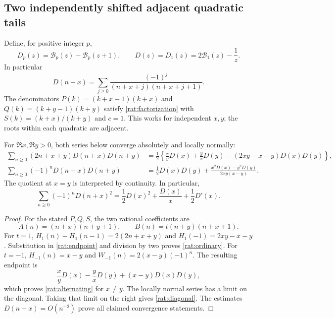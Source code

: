 \subsection{Two independently shifted adjacent quadratic tails}

Define, for positive integer $p$,
\begin{equation}\label{rat:D-definition}
 D_p(z)=\mathcal B_p(z)-\mathcal B_p(z+1),\qquad
 D(z)=D_1(z)=2\mathcal B_1(z)-\frac1z.
\end{equation}
In particular
\[
 D(n+x)=\sum_{j\ge0}\frac{(-1)^j}
                          {(n+x+j)(n+x+j+1)}.
\]
The denominators $P(k)=(k+x-1)(k+x)$ and
$Q(k)=(k+y-1)(k+y)$ satisfy \eqref{rat:factorization} with
$S(k)=(k+x)/(k+y)$ and $c=1$. This works for independent $x,y$;
the roots within each quadratic are adjacent.

\begin{theorem}\label{rat:kernels}
For $\Re x,\Re y>0$, both series below converge absolutely and
locally normally:
\begin{align}
 \sum_{n\ge0}(2n+x+y)D(n+x)D(n+y)
 &=\frac12\left\{\frac{x}{y}D(x)+\frac{y}{x}D(y)
                -(2xy-x-y)D(x)D(y)\right\},\label{rat:ordinary}\\
 \sum_{n\ge0}(-1)^nD(n+x)D(n+y)
 &=\frac12D(x)D(y)
    +\frac{x^2D(x)-y^2D(y)}{2xy(x-y)}.\label{rat:alternating}
\end{align}
The quotient at $x=y$ is interpreted by continuity. In particular,
\begin{equation}\label{rat:diagonal}
 \sum_{n\ge0}(-1)^nD(n+x)^2
     =\frac12D(x)^2+\frac{D(x)}x+\frac12D'(x).
\end{equation}
\end{theorem}

\begin{proof}
For the stated $P,Q,S$, the two rational coefficients are
\[
 A(n)=(n+x)(n+y+1),\qquad
 B(n)=t(n+y)(n+x+1).
\]
For $t=1$, $H_1(n)-H_1(n-1)=2(2n+x+y)$ and
$H_1(-1)=2xy-x-y$. Substitution in \eqref{rat:endpoint} and
division by two proves \eqref{rat:ordinary}. For $t=-1$,
$H_{-1}(n)=x-y$ and $W_{-1}(n)=2(x-y)(-1)^n$.
The resulting endpoint is
\[
 \frac{x}{y}D(x)-\frac{y}{x}D(y)+(x-y)D(x)D(y),
\]
which proves \eqref{rat:alternating} for $x\ne y$.
The locally normal series has a limit on the diagonal. Taking that
limit on the right gives \eqref{rat:diagonal}. The estimates
$D(n+x)=O(n^{-2})$ prove all claimed convergence statements.
\end{proof}

